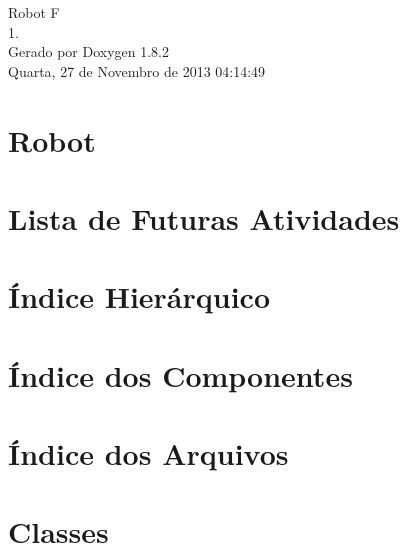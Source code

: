 \documentclass{book}
\begin{document}
\hypersetup{pageanchor=false,citecolor=blue}
\begin{titlepage}
\vspace*{7cm}
\begin{center}
{\Large Robot F \\[1ex]\large 1. }\\
\vspace*{1cm}
{\large Gerado por Doxygen 1.8.2}\\
\vspace*{0.5cm}
{\small Quarta, 27 de Novembro de 2013 04:14:49}\\
\end{center}
\end{titlepage}
\clearemptydoublepage
{}
\tableofcontents
\clearemptydoublepage
{}
\hypersetup{pageanchor=true,citecolor=blue}
\chapter{Robot}
\label{index}\hypertarget{index}{}
\chapter{Lista de Futuras Atividades}
\label{todo}
\hypertarget{todo}{}

\chapter{Índice Hierárquico}

\chapter{Índice dos Componentes}

\chapter{Índice dos Arquivos}

\chapter{Classes}


















\end{document}
